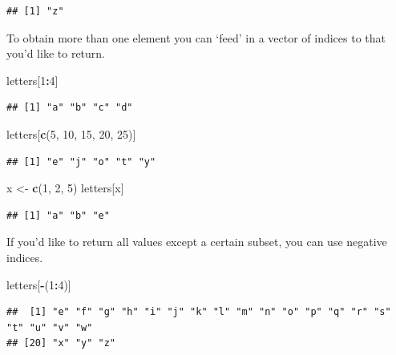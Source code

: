 \documentclass[
]{book}
\newenvironment{Shaded}{\begin{snugshade}}{\end{snugshade}}
\newcommand{\DecValTok}[1]{\textcolor[rgb]{0.00,0.00,0.81}{#1}}
\newcommand{\KeywordTok}[1]{\textcolor[rgb]{0.13,0.29,0.53}{\textbf{#1}}}
\newcommand{\NormalTok}[1]{#1}
\newcommand{\OperatorTok}[1]{\textcolor[rgb]{0.81,0.36,0.00}{\textbf{#1}}}
\newcommand{\StringTok}[1]{\textcolor[rgb]{0.31,0.60,0.02}{#1}}
\theoremstyle{definition}
\theoremstyle{definition}
\theoremstyle{definition}
\theoremstyle{remark}
\begin{document}
\begin{verbatim}
## [1] "z"
\end{verbatim}

To obtain more than one element you can `feed' in a vector of indices to that you'd like to return.

\begin{Shaded}
\begin{Highlighting}[]
\NormalTok{letters[}\DecValTok{1}\OperatorTok{:}\DecValTok{4}\NormalTok{]}
\end{Highlighting}
\end{Shaded}

\begin{verbatim}
## [1] "a" "b" "c" "d"
\end{verbatim}

\begin{Shaded}
\begin{Highlighting}[]
\NormalTok{letters[}\KeywordTok{c}\NormalTok{(}\DecValTok{5}\NormalTok{, }\DecValTok{10}\NormalTok{, }\DecValTok{15}\NormalTok{, }\DecValTok{20}\NormalTok{, }\DecValTok{25}\NormalTok{)]}
\end{Highlighting}
\end{Shaded}

\begin{verbatim}
## [1] "e" "j" "o" "t" "y"
\end{verbatim}

\begin{Shaded}
\begin{Highlighting}[]
\NormalTok{x <-}\StringTok{ }\KeywordTok{c}\NormalTok{(}\DecValTok{1}\NormalTok{, }\DecValTok{2}\NormalTok{, }\DecValTok{5}\NormalTok{)}
\NormalTok{letters[x]}
\end{Highlighting}
\end{Shaded}

\begin{verbatim}
## [1] "a" "b" "e"
\end{verbatim}

If you'd like to return all values except a certain subset, you can use negative indices.

\begin{Shaded}
\begin{Highlighting}[]
\NormalTok{letters[}\OperatorTok{-}\NormalTok{(}\DecValTok{1}\OperatorTok{:}\DecValTok{4}\NormalTok{)]}
\end{Highlighting}
\end{Shaded}

\begin{verbatim}
##  [1] "e" "f" "g" "h" "i" "j" "k" "l" "m" "n" "o" "p" "q" "r" "s" "t" "u" "v" "w"
## [20] "x" "y" "z"
\end{verbatim}
\end{document}
